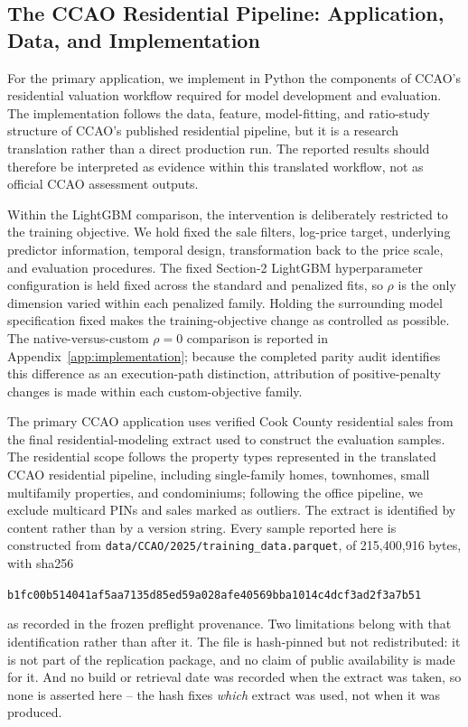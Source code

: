 \documentclass[10pt]{article}
\theoremstyle{definition}
\newcommand{\1}{\mathbf{1}}
\begin{document}
\subsection{{The CCAO Residential Pipeline: Application, Data, and Implementation}}
\label{subsec:ccao_design}


{For the primary application, we implement in Python the components of CCAO's residential valuation workflow required for model development and evaluation. The implementation follows the data, feature, model-fitting, and ratio-study structure of CCAO's published residential pipeline, but it is a research translation rather than a direct production run. The reported results should therefore be interpreted as evidence within this translated workflow, not as official CCAO assessment outputs.}


{Within the LightGBM comparison, the intervention is deliberately restricted to the training objective. We hold fixed the sale filters, log-price target, underlying predictor information, temporal design, transformation back to the price scale, and evaluation procedures. The
fixed Section-2 LightGBM hyperparameter configuration is held fixed across the standard and penalized fits, so $\rho$ is the only dimension varied within each penalized family.
Holding the surrounding model specification fixed makes the training-objective change as controlled as possible. The native-versus-custom $\rho=0$ comparison is reported in Appendix~\ref{app:implementation}; because the completed parity audit identifies this difference as an execution-path distinction, attribution of positive-penalty changes is made within each custom-objective family.}


The primary CCAO application uses verified Cook County residential sales from the final residential-modeling extract used to construct the evaluation samples. The residential scope follows the property types represented in the translated CCAO residential pipeline, including single-family homes, townhomes, small multifamily properties, and condominiums; following the office pipeline, we exclude multicard PINs and sales marked as outliers.
The extract is identified by content rather than by a version string. Every
sample reported here is constructed from
\texttt{data/CCAO/2025/training\_data.parquet}, of 215,400,916 bytes, with sha256
\begin{center}
\texttt{\small b1fc00b514041af5aa7135d85ed59a028afe40569bba1014c4dcf3ad2f3a7b51}
\end{center}
as recorded in the frozen preflight provenance. Two limitations belong
with that identification rather than after it. The file is hash-pinned but not
redistributed: it is not part of the replication package, and no claim of public
availability is made for it. And no build or retrieval date was recorded when the extract
was taken, so none is asserted here -- the hash fixes \emph{which} extract was used, not
when it was produced.
\end{document}

